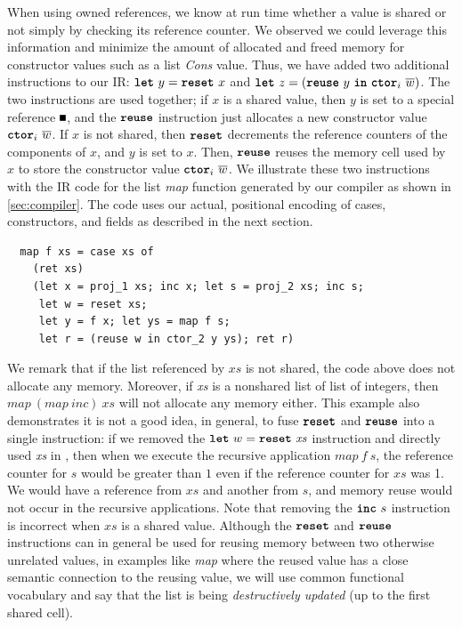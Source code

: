 When using owned references, we know at run time whether a
value is shared or not simply by checking its reference counter.
We observed we could leverage this information and minimize
the amount of allocated and freed memory for constructor values such as a
list \textit{Cons} value. Thus, we have added two additional instructions to our IR:
$\texttt{\textbf{let}}\ y = \texttt{\textbf{reset}}\ x$ and $\kw{let}\ z = (\kw{reuse}\ y\ \kw{in}\ \kw{ctor}_i\ \many{w})$.
The two instructions are used together; if $x$ is a shared value, then $y$ is set to
a special reference $\nullptr$,
and the $\texttt{\textbf{reuse}}$ instruction just allocates a new constructor value $\kw{ctor}_i\ \many{w}$.
If $x$ is not shared, then $\texttt{\textbf{reset}}$ decrements the
reference counters of the components of $x$, and $y$ is set to $x$. Then, $\texttt{\textbf{reuse}}$ reuses
the memory cell used by $x$ to store the constructor value $\kw{ctor}_i\ \many{w}$.
We illustrate these two instructions with the IR code for the list \textit{map} function
generated by our compiler as shown in \cref{sec:compiler}. The code uses our
actual, positional encoding of cases, constructors, and fields as described in
the next section.
\begin{lstlisting}
  map f xs = case xs of
    (ret xs)
    (let x = proj_1 xs; inc x; let s = proj_2 xs; inc s;
     let w = reset xs;
     let y = f x; let ys = map f s;
     let r = (reuse w in ctor_2 y ys); ret r)
\end{lstlisting}
We remark that if the list referenced by $\textit{xs}$ is not shared, the code above
does not allocate any memory. Moreover, if \textit{xs} is a nonshared list of list of integers,
then $\textit{map}\ (\textit{map}\ \textit{inc})\ \textit{xs}$ will not allocate
any memory either.
This example also demonstrates it is not a good idea, in general, to fuse
$\texttt{\textbf{reset}}$ and $\texttt{\textbf{reuse}}$ into a single instruction: if we removed the
$\kw{let}\ w = \kw{reset}\ \textit{xs}$ instruction and directly used
\textit{xs} in ,
then when we execute the recursive application $\textit{map}\ f\ s$, the reference counter for $s$ would
be greater than $1$ even if the reference counter for $\textit{xs}$ was 1.
We would have a reference from $\textit{xs}$ and another from $s$, and memory reuse would not occur in the recursive applications.
Note that removing the $\texttt{\textbf{inc}}\ s$ instruction is incorrect when
$\textit{xs}$ is a shared value.
Although the $\texttt{\textbf{reset}}$ and $\texttt{\textbf{reuse}}$ instructions can in general be used for reusing memory
between two otherwise unrelated values, in examples like \textit{map} where the
reused value has a close semantic connection to the reusing value, we will use
common functional vocabulary and say that the list is being \emph{destructively updated} (up to the first shared cell).

